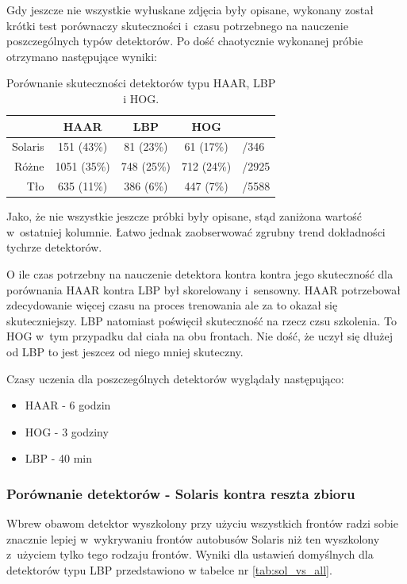 Gdy jeszcze nie wszystkie wyłuskane zdjęcia były opisane, wykonany został
krótki test porównaczy skuteczności i~czasu potrzebnego na nauczenie
poszczególnych typów detektorów. Po dość chaotycznie wykonanej próbie
otrzymano następujące wyniki:

\begin{table}[!h]
\centering
\begin{tabular}{r|c|c|c|l}
    & HAAR         & LBP        & HOG              &       \\
    \hline
Solaris & 151  (43\%)  & 81  (23\%) & 61 (17\%)        & /346  \\
Różne   & 1051 (35\%)  & 748 (25\%) & 712 (24\%)       & /2925 \\
Tło     & 635  (11\%)  & 386 (6\%)  & 447 (7\%)        & /5588 \\
\end{tabular}
\caption{Porównanie skuteczności detektorów typu HAAR, LBP i HOG.}
\label{tab:haar_lbp_hog_comparison}
\end{table}

Jako, że nie wszystkie jeszcze próbki były opisane, stąd zaniżona wartość
w~ostatniej kolumnie. Łatwo jednak zaobserwować zgrubny trend dokładności
tychrze detektorów.

O ile czas potrzebny na nauczenie detektora kontra kontra jego skuteczność
dla porównania HAAR kontra LBP był skorelowany i~sensowny. HAAR potrzebował
zdecydowanie więcej czasu na proces trenowania ale za to okazał się
skuteczniejszy. LBP natomiast poświęcił skuteczność na rzecz czsu szkolenia.
To HOG w~tym przypadku dał ciała na obu frontach. Nie dość, że uczył się
dłużej od LBP to jest jeszcez od niego mniej skuteczny.

Czasy uczenia dla poszczególnych detektorów wyglądały następująco:
\begin{itemize}
    \item HAAR - 6 godzin
    \item HOG - 3 godziny
    \item LBP - 40 min
\end{itemize}

\subsubsection{Porównanie detektorów - Solaris kontra reszta zbioru}

Wbrew obawom detektor wyszkolony przy użyciu wszystkich frontów radzi
sobie znacznie lepiej w~wykrywaniu frontów autobusów Solaris niż ten
wyszkolony z~użyciem tylko tego rodzaju frontów. Wyniki dla ustawień
domyślnych dla detektorów typu LBP przedstawiono w tabelce nr 
\ref{tab:sol_vs_all}.

